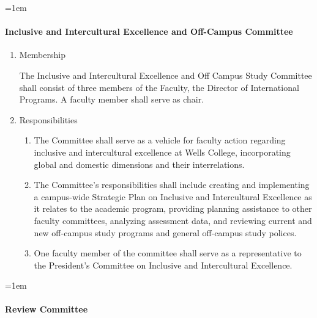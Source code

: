 \documentclass{manual}
\let\oldparagraph\paragraph
\renewcommand\paragraph{\leftskip=1em\oldparagraph}
\newcommand{\itemLevelA}{\alph*.}
\newcommand{\itemLevelB}{\arabic*)}
\newcommand{\itemRefA}{\alph*}
\newcommand{\itemRefB}{\arabic*}
\begin{document}
\paragraph{Inclusive and Intercultural Excellence and Off-Campus Committee}

\begin{enumerate}[label=\itemLevelA,ref=\itemRefA]
\item Membership

The Inclusive and Intercultural Excellence and Off Campus Study Committee shall consist of three members of the Faculty, the Director of International Programs. A faculty member shall serve as chair.
\item Responsibilities
\begin{enumerate}[label=\itemLevelB,ref=\itemRefB]
\item The Committee shall serve as a vehicle for faculty action regarding inclusive and intercultural excellence at Wells College, incorporating global and domestic dimensions and their interrelations.
\item The Committee's responsibilities shall include creating and implementing a campus-wide Strategic Plan on Inclusive and Intercultural Excellence as it relates to the academic program, providing planning assistance to other faculty committees, analyzing assessment data, and reviewing current and new off-campus study programs and general off-campus study polices.
\item One faculty member of the committee shall serve as a representative to the President's Committee on Inclusive and Intercultural Excellence.

\end{enumerate}
\end{enumerate}

\paragraph{Review Committee}\label{par:ReviewCommittee}
\end{document}
